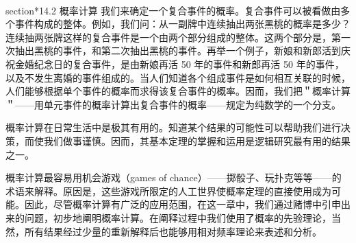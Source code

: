 \
\\section*{14.2 概率计算}
我们来确定一个复合事件的概率。复合事件可以被看做由多个事件构成的整体。例如，我们问：从一副牌中连续抽出两张黑桃的概率是多少？连续抽两张牌这样的复合事件是一个由两个部分组成的整体。这两个部分是，第一次抽出黑桃的事件，和第二次抽出黑桃的事件。再举一个例子，新娘和新郎活到庆祝金婚纪念日的复合事件，是由新娘再活 50 年的事件和新郎再活 50 年的事件，以及不发生离婚的事件组成的。当人们知道各个组成事件是如何相互关联的时候，人们能够根据单个事件的概率而求得该复合事件的概率。因而，我们把＂概率计算＂——用单元事件的概率计算出复合事件的概率——规定为纯数学的一个分支。

概率计算在日常生活中是极其有用的。知道某个结果的可能性可以帮助我们进行决策，而使我们做事谨慎。因而，其基本定理的掌握和运用是逻辑研究最有用的结果之一。

概率计算最容易用机会游戏（games of chance）——掷骰子、玩扑克等等——的术语来解释。原因是，这些游戏所限定的人工世界使概率定理的直接使用成为可能。因此，尽管概率计算有广泛的应用范围，在这一章中，我们通过赌博中引申出来的问题，初步地阐明概率计算。在阐释过程中我们使用了概率的先验理论，当然，所有结果经过少量的重新解释后也能够用相对频率理论来表述和分析。 